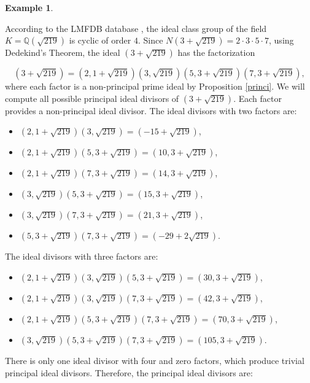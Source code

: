 \documentclass[11pt]{article}
\theoremstyle{definition}
\newtheorem{example}{Example}
\begin{document}
\begin{example}\label{ej1}
    
According to the LMFDB database \cite{LMFDB}, the ideal class group of the field $K=\mathbb{Q}(\sqrt{219})$ is cyclic of order $4$. Since $N(3+\sqrt{219})=2\cdot 3\cdot 5\cdot 7$, using Dedekind's Theorem, the ideal $(3+\sqrt{219})$ has the factorization 

\[ (3+\sqrt{219})=(2, 1+\sqrt{219}) (3, \sqrt{219})(5, 3+\sqrt{219})(7, 3+\sqrt{219}), \]
where each factor is a non-principal prime ideal by Proposition \ref{princi}. We will compute all possible principal ideal divisors of $(3+\sqrt{219})$. Each factor provides a non-principal ideal divisor. The ideal divisors with two factors are:
\begin{itemize}
    \item $(2,1+\sqrt{219})(3,\sqrt{219})=(-15+\sqrt{219})$,

    \item $(2,1+\sqrt{219})(5,3+\sqrt{219})=(10,3+\sqrt{219})$,

    \item $(2,1+\sqrt{219})(7,3+\sqrt{219})=(14,3+\sqrt{219})$,

    \item $(3,\sqrt{219})(5,3+\sqrt{219})=(15,3+\sqrt{219})$,

    \item $(3,\sqrt{219})(7,3+\sqrt{219})=(21,3+\sqrt{219})$,

    \item $(5,3+\sqrt{219})(7,3+\sqrt{219})=(-29+2\sqrt{219})$.
\end{itemize}

The ideal divisors with three factors are:

\begin{itemize}
    \item $(2,1+\sqrt{219})(3,\sqrt{219})(5,3+\sqrt{219})=(30,3+\sqrt{219})$,

    \item $(2,1+\sqrt{219})(3,\sqrt{219})(7,3+\sqrt{219})=(42,3+\sqrt{219})$,

    \item $(2,1+\sqrt{219})(5,3+\sqrt{219})(7,3+\sqrt{219})=(70,3+\sqrt{219})$,

    \item $(3,\sqrt{219})(5,3+\sqrt{219})(7,3+\sqrt{219})=(105,3+\sqrt{219})$.
\end{itemize}

There is only one ideal divisor with four and zero factors, which produce trivial principal ideal divisors. Therefore, the principal ideal divisors are:


\end{example}
\end{document}
